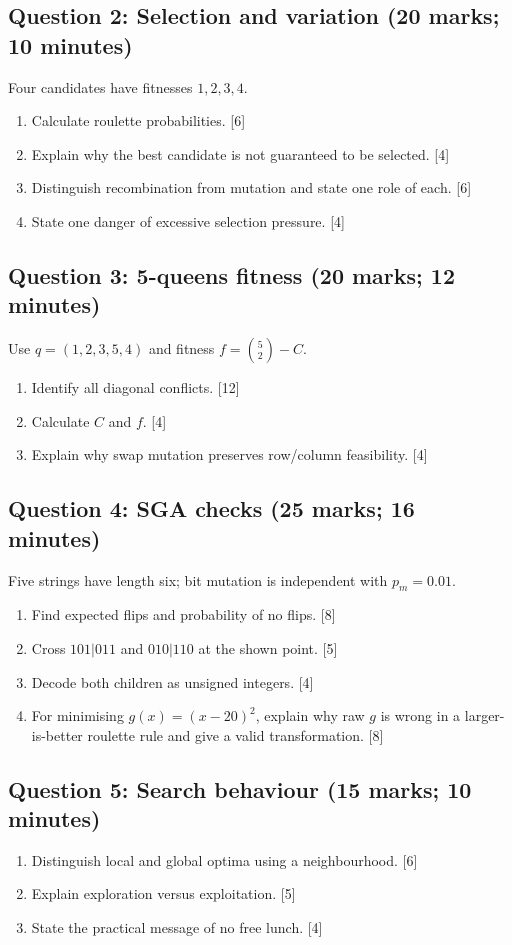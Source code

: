 \documentclass[11pt,a4paper]{article}
\begin{document}
\subsection*{Question 2: Selection and variation (20 marks; 10 minutes)}
Four candidates have fitnesses $1,2,3,4$.
\begin{enumerate}[label=(\alph*)]
\item Calculate roulette probabilities. \hfill[6]
\item Explain why the best candidate is not guaranteed to be selected. \hfill[4]
\item Distinguish recombination from mutation and state one role of each. \hfill[6]
\item State one danger of excessive selection pressure. \hfill[4]
\end{enumerate}

\subsection*{Question 3: 5-queens fitness (20 marks; 12 minutes)}
Use $q=(1,2,3,5,4)$ and fitness $f=\binom52-C$.
\begin{enumerate}[label=(\alph*)]
\item Identify all diagonal conflicts. \hfill[12]
\item Calculate $C$ and $f$. \hfill[4]
\item Explain why swap mutation preserves row/column feasibility. \hfill[4]
\end{enumerate}

\subsection*{Question 4: SGA checks (25 marks; 16 minutes)}
Five strings have length six; bit mutation is independent with $p_m=0.01$.
\begin{enumerate}[label=(\alph*)]
\item Find expected flips and probability of no flips. \hfill[8]
\item Cross $101|011$ and $010|110$ at the shown point. \hfill[5]
\item Decode both children as unsigned integers. \hfill[4]
\item For minimising $g(x)=(x-20)^2$, explain why raw $g$ is wrong in a larger-is-better roulette rule and give a valid transformation. \hfill[8]
\end{enumerate}

\subsection*{Question 5: Search behaviour (15 marks; 10 minutes)}
\begin{enumerate}[label=(\alph*)]
\item Distinguish local and global optima using a neighbourhood. \hfill[6]
\item Explain exploration versus exploitation. \hfill[5]
\item State the practical message of no free lunch. \hfill[4]
\end{enumerate}
\end{document}
